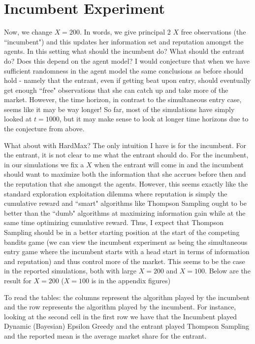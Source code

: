 \documentclass[11pt,letterpaper]{article}
\begin{document}
\section*{Incumbent Experiment}
Now, we change $X = 200$. In words, we give principal 2 $X$ free observations (the ``incumbent") and this updates her information set and reputation amongst the agents. In this setting what should the incumbent do? What should the entrant do? Does this depend on the agent model? I would conjecture that when we have sufficient randomness in the agent model the same conclusions as before should hold - namely that the entrant, even if getting beat upon entry, should eventually get enough ``free" observations that she can catch up and take more of the market. However, the time horizon, in contrast to the simultaneous entry case, seems like it may be way longer! So far, most of the simulations have simply looked at $t = 1000$, but it may make sense to look at longer time horizons due to the conjecture from above. \\
\vspace{0.25cm}

What about with HardMax? The only intuition I have is for the incumbent. For the entrant, it is not clear to me what the entrant should do. For the incumbent, in our simulations we fix a $X$ when the entrant will come in and the incumbent should want to maximize both the information that she accrues before then and the reputation that she amongst the agents. However, this seems exactly like the standard exploration exploitation dilemma where reputation is simply the cumulative reward and ``smart" algorithms like Thompson Sampling ought to be better than the ``dumb" algorithms at maximizing information gain while at the same time optimizing cumulative reward. Thus, I expect that Thompson Sampling should be in a better starting position at the start of the competing bandits game (we can view the incumbent experiment as being the simultaneous entry game where the incumbent starts with a head start in terms of information and reputation) and thus control more of the market. This seems to be the case in the reported simulations, both with large $X = 200$ and $X = 100$. Below are the result for $X = 200$ ($X = 100$ is in the appendix figures)

To read the tables: the columns represent the algorithm played by the incumbent and the row represents the algorithm played by the incumbent. For instance, looking at the second cell in the first row we have that the Incumbent played Dynamic (Bayesian) Epsilon Greedy and the entrant played Thompson Sampling and the reported mean is the average market share for the entrant.
\end{document}
